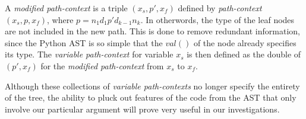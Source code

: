 A \textit{modified path-context} is a triple $(x_s, p', x_f)$ defined by \textit{path-context} $(x_s, p, x_f)$, where $p = n_{1}d_{1}p'd_{k-1}n_{k}$. In otherwords, the type of the leaf nodes are not included in the new path. This is done to remove redundant information, since the Python AST is so simple that the $val( )$ of the node already specifies its type.
The \textit{variable path-context} for variable $x_s$ is then defined as the double of $(p', x_f)$ for the \textit{modified path-context} from $x_s$ to $x_f$.

Although these collections of \textit{variable path-contexts} no longer specify the entirety of the tree, the ability to pluck out features of the code from the AST that only involve our particular argument will prove very useful in our investigations. 











